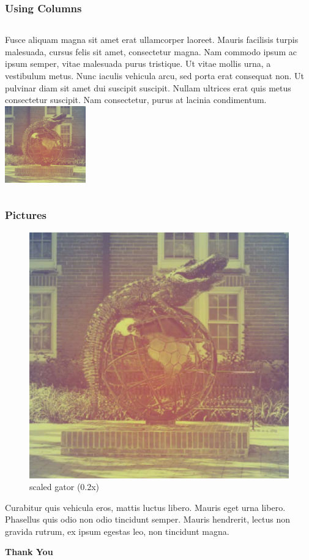 \documentclass{beamer}
\begin{document}
\begin{frame}
\frametitle{Using Columns}
\begin{columns}
Fusce aliquam magna sit amet erat ullamcorper laoreet. Mauris facilisis turpis malesuada, cursus felis sit amet, consectetur magna. Nam commodo ipsum ac ipsum semper, vitae malesuada purus tristique. Ut vitae mollis urna, a vestibulum metus. Nunc iaculis vehicula arcu, sed porta erat consequat non. Ut pulvinar diam sit amet dui suscipit suscipit. Nullam ultrices erat quis metus consectetur suscipit. Nam consectetur, purus at lacinia condimentum.
\centering 
\includegraphics[width=3.5cm]{gator.png}
\end{columns}
\end{frame}



\begin{frame}
\frametitle{Pictures}
\begin{figure}
\includegraphics[scale=0.2]{gator.png}
\caption{scaled gator (0.2x)}
\end{figure}
Curabitur quis vehicula eros, mattis luctus libero. Mauris eget urna libero. Phasellus quis odio non odio tincidunt semper. Mauris hendrerit, lectus non gravida rutrum, ex ipsum egestas leo, non tincidunt magna.
\end{frame}

\begin{frame}{}
  \centering \Large
  \textbf{Thank You}
\end{frame}
\end{document}
